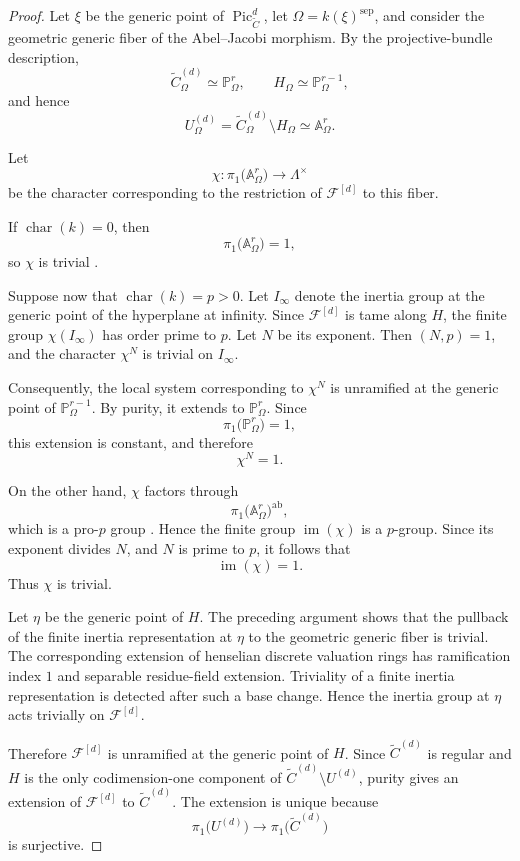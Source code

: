 \documentclass[11pt]{article}
\theoremstyle{remark}
\newcommand{\A}{\mathbb A}
\newcommand{\Pj}{\mathbb P}
\newcommand{\F}{\mathcal F}
\newcommand{\Pic}{\operatorname{Pic}}
\begin{document}
\begin{proof}
Let $\xi$ be the generic point of $\Pic^{d}_{\widetilde C}$, let
$\Omega=k(\xi)^{\mathrm{sep}}$, and consider the geometric generic fiber of
the Abel--Jacobi morphism.  By the projective-bundle description,
\[
    \widetilde C^{(d)}_{\Omega}\simeq \Pj^{r}_{\Omega},
    \qquad
    H_{\Omega}\simeq \Pj^{r-1}_{\Omega},
\]
and hence
\[
    U^{(d)}_{\Omega}
      =\widetilde C^{(d)}_{\Omega}\setminus H_{\Omega}
      \simeq \A^{r}_{\Omega}.
\]

Let
\[
    \chi\colon
    \pi_{1}\bigl(\A^{r}_{\Omega}\bigr)
       \longrightarrow \Lambda^{\times}
\]
be the character corresponding to the restriction of $\F^{[d]}$ to this
fiber.

If $\operatorname{char}(k)=0$, then
\[
    \pi_{1}\bigl(\A^{r}_{\Omega}\bigr)=1,
\]
so $\chi$ is trivial \cite[Example~4.14]{Tendler}.

Suppose now that $\operatorname{char}(k)=p>0$.  Let $I_{\infty}$ denote the
inertia group at the generic point of the hyperplane at infinity.  Since
$\F^{[d]}$ is tame along $H$, the finite group $\chi(I_{\infty})$ has order
prime to $p$.  Let $N$ be its exponent.  Then $(N,p)=1$, and the character
$\chi^{N}$ is trivial on $I_{\infty}$.

Consequently, the local system corresponding to $\chi^{N}$ is unramified at
the generic point of $\Pj^{r-1}_{\Omega}$.  By purity, it extends to
$\Pj^{r}_{\Omega}$.  Since
\[
    \pi_{1}\bigl(\Pj^{r}_{\Omega}\bigr)=1,
\]
this extension is constant, and therefore
\[
    \chi^{N}=1.
\]

On the other hand, $\chi$ factors through
\[
    \pi_{1}\bigl(\A^{r}_{\Omega}\bigr)^{\mathrm{ab}},
\]
which is a pro-$p$ group \cite[Example~4.15]{Tendler}.  Hence the finite group
$\operatorname{im}(\chi)$ is a $p$-group.  Since its exponent divides $N$,
and $N$ is prime to $p$, it follows that
\[
    \operatorname{im}(\chi)=1.
\]
Thus $\chi$ is trivial.

Let $\eta$ be the generic point of $H$.  The preceding argument shows that
the pullback of the finite inertia representation at $\eta$ to the geometric
generic fiber is trivial.  The corresponding extension of henselian discrete
valuation rings has ramification index $1$ and separable residue-field
extension.  Triviality of a finite inertia representation is detected after
such a base change.  Hence the inertia group at $\eta$ acts trivially on
$\F^{[d]}$.

Therefore $\F^{[d]}$ is unramified at the generic point of $H$.  Since
$\widetilde C^{(d)}$ is regular and $H$ is the only codimension-one component
of $\widetilde C^{(d)}\setminus U^{(d)}$, purity gives an extension of
$\F^{[d]}$ to $\widetilde C^{(d)}$.  The extension is unique because
\[
    \pi_{1}\bigl(U^{(d)}\bigr)
       \longrightarrow
    \pi_{1}\bigl(\widetilde C^{(d)}\bigr)
\]
is surjective.
\end{proof}
\end{document}
